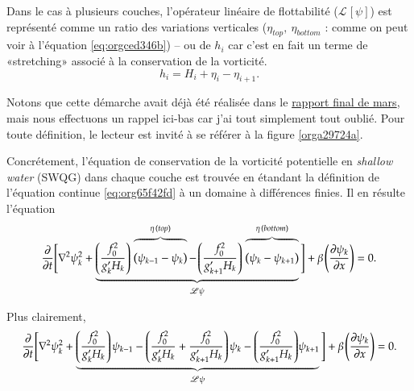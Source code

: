 \documentclass[10pt]{article}
\numberwithin{equation}{section}
\newcommand{\pt}{\hspace{1pt}}
\newcommand{\grande}{\vphantom{\frac{1}{xx}}}
\begin{document}
Dans le cas à plusieurs couches, l'opérateur linéaire de flottabilité (\(\mathscr{L}\pt[\psi]\)) est représenté comme un ratio des variations verticales (\(\eta_{top},\ \eta_{bottom}\) : comme on peut voir à l'équation \ref{eq:orgced346b}) -- ou de \(h_i\) car c'est en fait un terme de «stretching» associé à la conservation de la vorticité.
\begin{equation}
   h_i = H_i + \eta_i - \eta_{i+1}.
\end{equation}

Notons que cette démarche avait déjà été réalisée dans le \href{rapport-2023-03-31.pdf}{rapport final de mars}, mais nous effectuons un rappel ici-bas car j'ai tout simplement tout oublié.
Pour toute définition, le lecteur est invité à se référer à la figure \ref{orga29724a}. \bigskip

Concrétement, l'équation de conservation de la vorticité potentielle en \emph{shallow water} (SWQG) dans chaque couche \citep[p.186]{vallis_2006} est trouvée en étandant la définition de l'équation continue \ref{eq:org65f42fd} à un domaine à différences finies.
Il en résulte l'équation
\begin{equation}
\label{eq:orgced346b}
   \pdv{}{t} \Bigg[ \laplacian{\psi^2_k} + \underbrace{\qty(\frac{f_0^2}{g_k' H_k})\pt \overbrace{\qty(\psi_{k-1}-\psi_k)\grande}^{\eta\pt(top)} -\pt \qty(\frac{f_0^2}{g_{k+1}' H_k})\pt \overbrace{\qty(\psi_{k} - \psi_{k+1})\grande}^{\eta\pt(bottom)}}_{\mathscr{L \psi}} \Bigg] + \beta\pt \qty(\pdv{\psi_k}{x}) = 0.
\end{equation}

Plus clairement,
\begin{equation}
   \pdv{}{t} \Bigg[ \laplacian{\psi^2_k} + \underbrace{\qty(\frac{f_0^2}{g_k' H_k})\pt \psi_{k-1} - \qty(\frac{f_0^2}{g_k' H_k} + \frac{f_0^2}{g_{k+1}' H_k}) \pt \psi_{k} - \qty(\frac{f_0^2}{g_{k+1}' H_k})\psi_{k+1}}_\mathscr{L\psi} \Bigg] + \beta\pt \qty(\pdv{\psi_k}{x}) = 0.
\end{equation}
\end{document}
